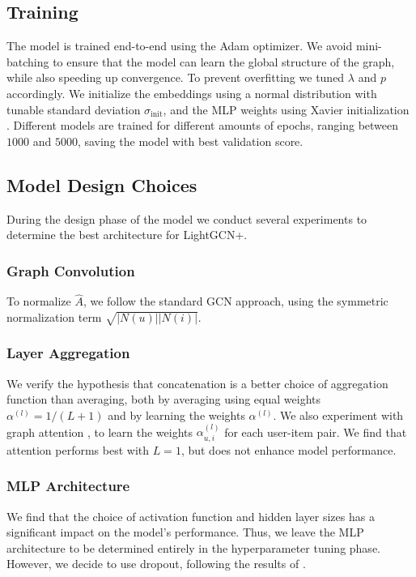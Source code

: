 \documentclass[10pt,conference,compsocconf]{IEEEtran}
\begin{document}
\subsection{Training}
The model is trained end-to-end using the Adam optimizer.
We avoid mini-batching to ensure that the model can learn the global structure of the graph, while also speeding up convergence. 
To prevent overfitting we tuned $\lambda$ and $p$ accordingly. 
We initialize the embeddings using a normal distribution with tunable standard deviation $\sigma_{\text{init}}$, and the MLP weights using Xavier initialization \cite{glorot2010understanding}.
Different models are trained for different amounts of epochs, ranging between $1000$ and $5000$, saving the model with best validation score.

\subsection{Model Design Choices}
During the design phase of the model we conduct several experiments to determine the best architecture for LightGCN+.
\subsubsection{Graph Convolution}
To normalize $\hat{A}$, we follow the standard GCN \cite{kipf2017semi} approach, using the symmetric normalization term $\sqrt{|N(u)||N(i)|}$.
\subsubsection{Layer Aggregation}
We verify the hypothesis that concatenation is a better choice of aggregation function than averaging, both by averaging using equal weights $\alpha^{(l)} = 1/(L+1)$ and by learning the weights $\alpha^{(l)}$.
We also experiment with graph attention \cite{velivckovic2018graph}, to learn the weights $\alpha_{u,i}^{(l)}$ for each user-item pair.
We find that attention performs best with $L=1$, but does not enhance model performance.
\subsubsection{MLP Architecture}
We find that the choice of activation function and hidden layer sizes has a significant impact on the model's performance.
Thus, we leave the MLP architecture to be determined entirely in the hyperparameter tuning phase. However, we decide to use dropout, following the results of \cite{berg2017graph}.
\end{document}
